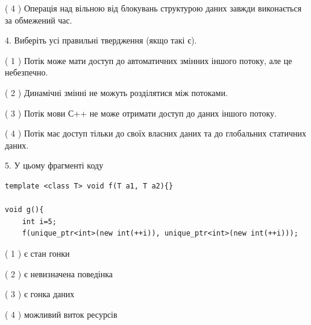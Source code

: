 \documentclass[12pt, ukrainian]{article}
\begin{document}
\begin {large}
{( 4 ) Операція над вільною від блокувань структурою даних завжди виконається за обмежений час.%


4. Виберіть усі правильні твердження (якщо такі є).\par
\vspace{2mm}

( 1 ) Потік може мати доступ до автоматичних змінних іншого потоку, але це небезпечно.%

( 2 ) Динамічні змінні не можуть розділятися між потоками.%

( 3 ) Потік мови С++ не може отримати доступ до даних іншого потоку.%

( 4 ) Потік має доступ тільки до своїх власних даних та до глобальних статичних даних.%


5. У цьому фрагменті коду
\begin{verbatim}
template <class T> void f(T a1, T a2){}

void g(){
    int i=5;
    f(unique_ptr<int>(new int(++i)), unique_ptr<int>(new int(++i)));
\end{verbatim}

( 1 ) є стан гонки%

( 2 ) є невизначена поведінка%

( 3 ) є гонка даних%

( 4 ) можливий виток ресурсів%
}
\end {large}
\end{document}
